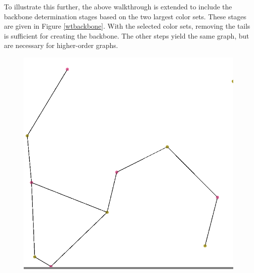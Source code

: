 \documentclass{article}
\begin{document}
        \par
        To illustrate this further, the above walkthrough is extended to include the backbone determination stages based on the two largest color sets. These stages are given in Figure \ref{wtbackbone}. With the selected color sets, removing the tails is sufficient for creating the backbone. The other steps yield the same graph, but are necessary for higher-order graphs.

        \begin{figure}
            \begin{minipage}{0.3\textwidth}
            \colorbox{gray}{\includegraphics[width=\linewidth]{./images/bipartite-wt.png}}
            \end{minipage}
            \hspace{\fill}
            \begin{minipage}{0.3\textwidth}

\end{minipage}
\end{figure}
\end{document}
